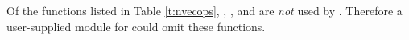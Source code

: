 Of the functions listed in Table \ref{t:nvecops}, , 
, and  are {\em not} used by
{\idas}. Therefore a user-supplied {\nvector} module for {\idas} could
omit these functions. 











